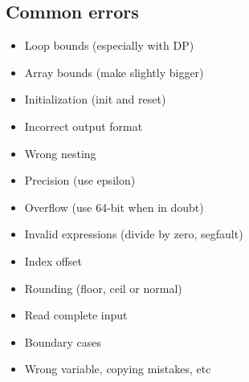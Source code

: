 \subsection{Common errors}
\begin{multicols}{2}
\begin{itemize}
\item Loop bounds (especially with DP)
\item Array bounds (make slightly bigger)
\item Initialization (init and reset)
\item Incorrect output format
\item Wrong nesting
\item Precision (use epsilon)
\item Overflow (use 64-bit when in doubt)
\item Invalid expressions (divide by zero, segfault)
\item Index offset
\item Rounding (floor, ceil or normal)
\item Read complete input
\item Boundary cases
\item Wrong variable, copying mistakes, etc
\end{itemize} 
\end{multicols}
